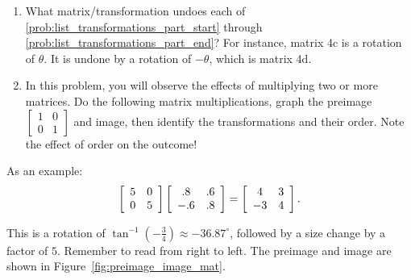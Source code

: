 \documentclass[../textbook.tex]{subfiles}
\begin{document}
\begin{enumerate}
\begin{enumerate}
\end{enumerate}
\item What matrix/transformation undoes each of \ref{prob:list_transformations_part_start} through \ref{prob:list_transformations_part_end}? For instance, matrix 4c is a rotation of $\theta$. It is undone by a rotation of $-\theta$, which is matrix 4d.
\item In this problem, you will observe the effects of multiplying two or more matrices. Do the following matrix multiplications, graph the preimage $\left[\begin{array}{cc}1 & 0 \\ 0 & 1\end{array}\right]$ and image, then identify the transformations and their order. Note the effect of order on the outcome!
\setcounter{problem_i}{\value{enumi}}
\end{enumerate}

\noindent As an example:
$$\left[\begin{array}{cc} 5 & 0 \\ 0 & 5 \end{array}\right]\left[\begin{array}{cc} .8 & .6 \\ -.6 & .8 \end{array}\right]=\left[\begin{array}{cc} 4 & 3 \\ -3 & 4 \end{array}\right].$$

\noindent This is a rotation of $\tan^{-1}\left(-\frac{3}{4}\right)\approx-36.87^\circ$, followed by a size change by a factor of $5$. Remember to read from right to left. The preimage and image are shown in Figure~\ref{fig:preimage_image_mat}.

\end{document}
